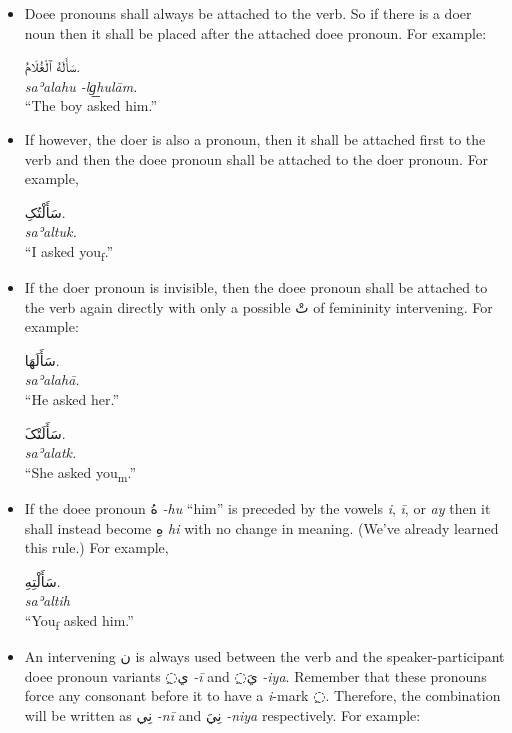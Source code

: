 \documentclass[
  10pt,
]{book}
\begin{document}
\begin{itemize}
\item
  Doee pronouns shall always be attached to the verb. So if there is a doer noun then it shall be placed after the attached doee pronoun. For example:

  \foreignlanguage{arabic}{سَأَلَهُ ٱلْغُلَامُ.}\\
  \emph{saʾalahu -lg͟hulām.}\\
  \enquote{The boy asked him.}
\item
  If however, the doer is also a pronoun, then it shall be attached first to the verb and then the doee pronoun shall be attached to the doer pronoun. For example,

  \foreignlanguage{arabic}{سَأَلْتُکِ.}\\
  \emph{saʾaltuk.}\\
  \enquote{I asked you\textsubscript{f}.}
\item
  If the doer pronoun is invisible, then the doee pronoun shall be attached to the verb again directly with only a possible \foreignlanguage{arabic}{تْ} of femininity intervening. For example:

  \foreignlanguage{arabic}{سَأَلَهَا.}\\
  \emph{saʾalahā.}\\
  \enquote{He asked her.}

  \foreignlanguage{arabic}{سَأَلَتْکَ.}\\
  \emph{saʾalatk.}\\
  \enquote{She asked you\textsubscript{m}.}
\item
  If the doee pronoun \foreignlanguage{arabic}{هُ} \emph{-hu} \enquote{him} is preceded by the vowels \emph{i}, \emph{ī}, or \emph{ay} then it shall instead become \foreignlanguage{arabic}{هِ} \emph{hi} with no change in meaning. (We've already learned this rule.) For example,

  \foreignlanguage{arabic}{سَأَلْتِهِ.}\\
  \emph{saʾaltih}\\
  \enquote{You\textsubscript{f} asked him.}
\item
  An intervening \foreignlanguage{arabic}{ن} is always used between the verb and the speaker-participant doee pronoun variants \foreignlanguage{arabic}{◌ِي} \emph{-ī} and \foreignlanguage{arabic}{◌ِيَ} \emph{-iya}. Remember that these pronouns force any consonant before it to have a \emph{i}-mark \foreignlanguage{arabic}{◌ِ}. Therefore, the combination will be written as \foreignlanguage{arabic}{نِي} \emph{-nī} and \foreignlanguage{arabic}{نِيَ} \emph{-niya} respectively. For example:


\end{itemize}
\end{document}

